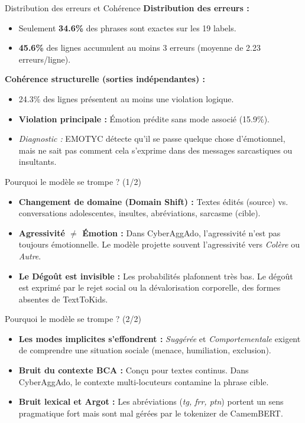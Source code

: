 \documentclass{beamer}
\begin{document}
\begin{frame}{Distribution des erreurs et Cohérence}
    \textbf{Distribution des erreurs :}
    \begin{itemize}
        \item Seulement \textbf{34.6\%} des phrases sont exactes sur les 19 labels.
        \item \textbf{45.6\%} des lignes accumulent au moins 3 erreurs (moyenne de 2.23 erreurs/ligne).
    \end{itemize}

    \vspace{0.5cm}
    \textbf{Cohérence structurelle (sorties indépendantes) :}
    \begin{itemize}
        \item 24.3\% des lignes présentent au moins une violation logique.
        \item \textbf{Violation principale :} Émotion prédite sans mode associé (15.9\%).
        \item \textit{Diagnostic :} EMOTYC détecte qu'il se passe quelque chose d'émotionnel, mais ne sait pas comment cela s'exprime dans des messages sarcastiques ou insultants.
    \end{itemize}
\end{frame}

\begin{frame}{Pourquoi le modèle se trompe ? (1/2)}
    \begin{itemize}
        \item \textbf{Changement de domaine (Domain Shift) :} Textes édités (source) vs. conversations adolescentes, insultes, abréviations, sarcasme (cible).
        \item \textbf{Agressivité $\neq$ Émotion :} Dans CyberAggAdo, l'agressivité n'est pas toujours émotionnelle. Le modèle projette souvent l'agressivité vers \textit{Colère} ou \textit{Autre}.
        \item \textbf{Le Dégoût est invisible :} Les probabilités plafonnent très bas. Le dégoût est exprimé par le rejet social ou la dévalorisation corporelle, des formes absentes de TextToKids.
    \end{itemize}
\end{frame}

\begin{frame}{Pourquoi le modèle se trompe ? (2/2)}
    \begin{itemize}
        \item \textbf{Les modes implicites s'effondrent :} \textit{Suggérée} et \textit{Comportementale} exigent de comprendre une situation sociale (menace, humiliation, exclusion).
        \item \textbf{Bruit du contexte BCA :} Conçu pour textes continus. Dans CyberAggAdo, le contexte multi-locuteurs contamine la phrase cible.
        \item \textbf{Bruit lexical et Argot :} Les abréviations (\textit{tg, frr, ptn}) portent un sens pragmatique fort mais sont mal gérées par le tokenizer de CamemBERT.
    \end{itemize}
\end{frame}
\end{document}

